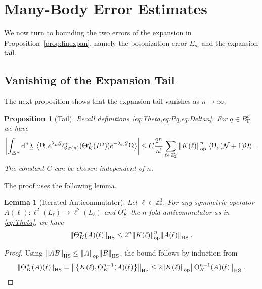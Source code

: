 \documentclass[12pt,a4paper]{article}
\numberwithin{equation}{section}
\newcommand{\1}{\mathbb{I}}
\newcommand{\di}{\textnormal{d}}
\newcommand{\F}{\mathrm{F}}
\newcommand{\HS}{\mathrm{HS}}
\newcommand{\Z}{\mathbb{Z}}
\newcommand{\NN}{\mathcal{N}}
\newcommand{\eva}[1]{\left\langle #1 \right\rangle}
\theoremstyle{plain}
\newtheorem{lemma}[theorem]{Lemma}
\newtheorem{proposition}[theorem]{Proposition}
\theoremstyle{definition}
\theoremstyle{remark}
\theoremstyle{plain}
\theoremstyle{definition}
\theoremstyle{remark}
\begin{document}
\section{Many-Body Error Estimates}
\label{subsec:manybody_estimates}

We now turn to bounding the two errors of the expansion in Proposition~\ref{prop:finexpan}, namely the bosonization error $ E_m $ and the expansion tail.


\subsection{Vanishing of the Expansion Tail}
\label{subsec:tailestimate}

The next proposition shows that the expansion tail vanishes as $ n \to \infty $.
%
\begin{proposition}[Tail]\label{prop:headerr}
Recall definitions \cref{eq:Theta,eq:Pq,eq:Deltan}. For $q \in B^c_{\F}$ we have
\begin{equation}\label{eq:headest}
	\abs{\int_{\Delta^n} \di^n\underline{\lambda} \;
		\eva{\Omega, e^{\lambda_n S}Q_{\sigma(n)}(\Theta^n_{K}(P^q)) e^{-\lambda_n S} \Omega} }
	\leq C \frac{2^n}{n!} \sum_{\ell \in \Z^3_*} \norm{K(\ell)}^n_{\mathrm{op}} \, \eva{\Omega,(\NN+1)\Omega} \;.
\end{equation}
The constant $C$ can be chosen independent of $n$.
\end{proposition}
%
The proof uses the following lemma.
%
\begin{lemma}[Iterated Anticommutator]\label{lem:multicommest}
Let $ \ell \in \Z^3_* $. For any symmetric operator $ A(\ell): \ell^2(L_\ell) \to \ell^2(L_\ell) $ and $\Theta^n_K$ the $ n $-fold anticommutator as in \eqref{eq:Theta}, we have
\begin{equation}
	\norm{\Theta^{n}_K(A)(\ell)}_{\HS}
	\leq 2^n \norm{K(\ell)}^{n}_{\mathrm{op}}\norm{A(\ell)}_{\HS} \;.
\end{equation}
\end{lemma}
%
\begin{proof}
Using $\norm{AB}_{\HS} \leq \norm{A}_{\mathrm{op}} \norm{B}_{\HS}$, the bound follows by induction from
\[
	\norm{\Theta^{n}_K(A)(\ell)}_{\HS}
	= \norm{\left\{K(\ell),\Theta^{n-1}_K(A)(\ell)\right\}}_{\HS}
	\leq 2 \norm{K(\ell)}_{\mathrm{op}}\norm{\Theta^{n-1}_K(A)(\ell)}_{\HS} \;. \qedhere
\]
\end{proof}
\end{document}
